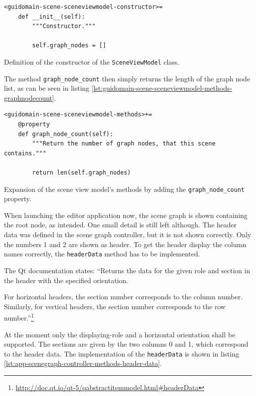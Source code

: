 \documentclass[10pt, openright, notitlepage]{scrreprt}
\begin{document}
\begin{listing}[H]
\begin{verbatim}
<guidomain-scene-sceneviewmodel-constructor>=
    def __init__(self):
        """Constructor."""
    
        self.graph_nodes = []
\end{verbatim}
\caption{\label{lst:guidomain-scene-scenegraphviewmodel-constructor}
Definition of the constructor of the \texttt{SceneViewModel} class.}
\end{listing}

The method \texttt{graph\_node\_count} then simply returns the length of the
graph node list, as can be seen in listing
\ref{lst:guidomain-scene-sceneviewmodel-methods-graphnodecount}.

\begin{listing}[H]
\begin{verbatim}
<guidomain-scene-sceneviewmodel-methods>+=
    @property
    def graph_node_count(self):
        """Return the number of graph nodes, that this scene contains."""
    
        return len(self.graph_nodes)
\end{verbatim}
\caption{\label{lst:guidomain-scene-sceneviewmodel-methods-graphnodecount}
Expansion of the scene view model's methods by adding the \texttt{graph\_node\_count} property.}
\end{listing}

When launching the editor application now, the scene graph is shown containing
the root node, as intended. One small detail is still left although. The header
data was defined in the scene graph controller, but it is not shown correctly.
Only the numbers 1 and 2 are shown as header. To get the header display the
column names correctly, the \texttt{headerData} method has to be implemented.

The Qt documentation states: ``Returns the data for the given role and section
in the header with the specified orientation.

For horizontal headers, the section number corresponds to the column number.
Similarly, for vertical headers, the section number corresponds to the row
number.''\footnote{\url{http://doc.qt.io/qt-5/qabstractitemmodel.html\#headerData}}

At the moment only the displaying-role and a horizontal orientation shall be
supported. The sections are given by the two columns 0 and 1, which correspond
to the header data. The implementation of the \texttt{headerData} is shown in
listing \ref{lst:app-scenegraph-controller-methods-header-data}.
\end{document}
